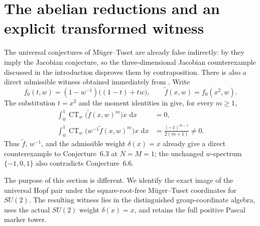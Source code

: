 \documentclass[11pt]{article}
\numberwithin{equation}{section}
\newcommand{\CT}{\operatorname{CT}}
\newcommand{\dd}{\,\mathrm d}
\begin{document}
\section{The abelian reductions and an explicit transformed witness}

The universal conjectures of M\"uger--Tuset are already false indirectly:
by \cite[Remark~6.7(2)]{MugerTuset2025} they imply the Jacobian conjecture, so
the three-dimensional Jacobian counterexample discussed in the introduction
disproves them by contraposition.  There is also a direct admissible witness
obtained immediately from \cite[Theorem~2.1]{Long2026}.  Write
\[
 f_0(t,w)=(1-w^{-1})\bigl((1-t)+tw\bigr),
 \qquad
 \widetilde f(x,w)=f_0(x^2,w).
\]
The substitution $t=x^2$ and the moment identities in \cite{Long2026} give,
for every $m\geq1$,
\begin{align*}
 \int_0^1\CT_w\!\bigl(\widetilde f(x,w)^m\bigr)x\,\dd x
 &=0,\\
 \int_0^1\CT_w\!\bigl(w^{-1}\widetilde f(x,w)^m\bigr)x\,\dd x
 &=\frac{(-1)^{m-1}}{2(m+1)}\neq0.
\end{align*}
Thus $\widetilde f$, $w^{-1}$, and the admissible weight $\delta(x)=x$
already give a direct counterexample to Conjecture~6.3 at $N=M=1$; the
unchanged $w$-spectrum $\{-1,0,1\}$ also contradicts Conjecture~6.6.

The purpose of this section is different.  We identify the exact image of the
universal Hopf pair under the square-root-free M\"uger--Tuset coordinates for
$SU(2)$.  The resulting witness lies in the distinguished group-coordinate
algebra, uses the actual $SU(2)$ weight $\delta(x)=x$, and retains the full
positive Pascal marker tower.
\end{document}
